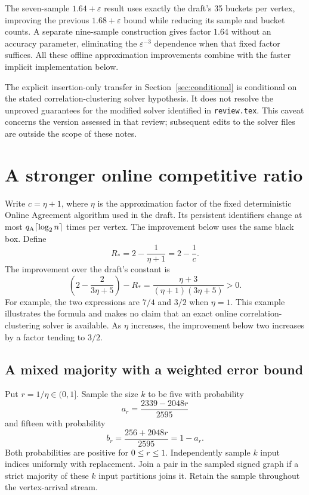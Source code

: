 \documentclass[11pt]{article}
\begin{document}
The seven-sample $1.64+\varepsilon$ result uses exactly the draft's
35 buckets per vertex, improving the previous $1.68+\varepsilon$
bound while reducing its sample and bucket counts. A separate
nine-sample construction gives factor $1.64$ without an accuracy
parameter, eliminating the $\varepsilon^{-3}$ dependence when that
fixed factor suffices. All these offline approximation improvements
combine with the faster implicit implementation below.

The explicit insertion-only transfer in Section~\ref{sec:conditional}
is conditional on the stated correlation-clustering solver hypothesis.
It does not resolve the unproved guarantees for the modified solver
identified in \texttt{review.tex}. This caveat concerns the version
assessed in that review; subsequent edits to the solver files are
outside the scope of these notes.

\section{A stronger online competitive ratio}
\label{sec:improved-online}

Write $c=\eta+1$, where $\eta$ is the approximation factor of the
fixed deterministic Online Agreement algorithm used in the draft.
Its persistent identifiers change at most $q_{\rm A}\lceil\log_2 n\rceil$
times per vertex. The improvement below uses the same black box.
Define
\[
 R_* = 2-\frac{1}{\eta+1}=2-\frac1c.
\]
The improvement over the draft's constant is
\[
 \left(2-\frac{2}{3\eta+5}\right)-R_*
 =\frac{\eta+3}{(\eta+1)(3\eta+5)}>0.
\]
For example, the two expressions are $7/4$ and $3/2$ when $\eta=1$.
This example illustrates the formula and makes no claim that an exact
online correlation-clustering solver is available. As $\eta$ increases,
the improvement below two increases by a factor tending to $3/2$.

\subsection{A mixed majority with a weighted error bound}

Put $r=1/\eta\in(0,1]$. Sample the size $k$ to be five with probability
\[
 a_r=\frac{2339-2048r}{2595}
\]
and fifteen with probability
\[
 b_r=\frac{256+2048r}{2595}=1-a_r.
\]
Both probabilities are positive for $0\le r\le1$.
Independently sample $k$ input indices uniformly with replacement.
Join a pair in the sampled signed graph if a strict majority of these
$k$ input partitions joins it. Retain the sample throughout the
vertex-arrival stream.
\end{document}
